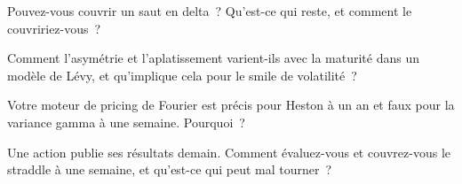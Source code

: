 \begin{interviewq}\label{iq:dv:jumps-and-levy-models:3}
Pouvez-vous couvrir un saut en delta~? Qu'est-ce qui reste, et comment le couvririez-vous~?
\end{interviewq}

\begin{interviewq}\label{iq:dv:jumps-and-levy-models:4}
Comment l'asymétrie et l'aplatissement varient-ils avec la maturité dans un modèle de Lévy, et qu'implique cela pour le smile de volatilité~?
\end{interviewq}

\begin{interviewq}\label{iq:dv:jumps-and-levy-models:5}
Votre moteur de pricing de Fourier est précis pour Heston à un an et faux pour la variance gamma à une semaine. Pourquoi~?
\end{interviewq}

\begin{interviewq}\label{iq:dv:jumps-and-levy-models:6}
Une action publie ses résultats demain. Comment évaluez-vous et couvrez-vous le straddle à une semaine, et qu'est-ce qui peut mal tourner~?
\end{interviewq}
